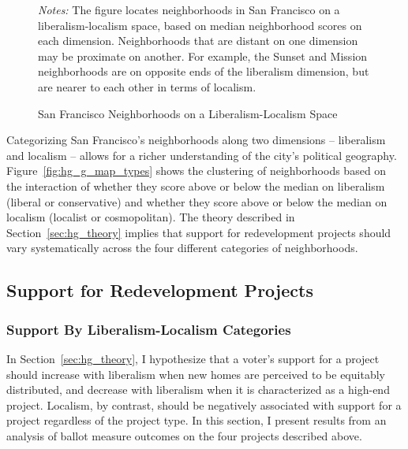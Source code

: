 \documentclass[article,12pt]{memoir}
\begin{document}
\begin{figure}\centering
  \caption{San Francisco Neighborhoods on a Liberalism-Localism Space}
  \label{fig:hg_g_libloc_space}
  \begin{measuredfigure}
  \end{measuredfigure}
  \begin{tablenotes}[flushleft]
    \item \hspace{-.2em}\emph{Notes:} The figure locates neighborhoods in San Francisco on a liberalism-localism space, based on median neighborhood scores on each dimension. Neighborhoods that are distant on one dimension may be proximate on another. For example, the Sunset and Mission neighborhoods are on opposite ends of the liberalism dimension, but are nearer to each other in terms of localism.
  \end{tablenotes}
\end{figure}

Categorizing San Francisco's neighborhoods along two dimensions -- liberalism and localism -- allows for a richer understanding of the city's political geography.  Figure~\ref{fig:hg_g_map_types} shows the clustering of neighborhoods based on the interaction of whether they score above or below the median on liberalism (liberal or conservative) and whether they score above or below the median on localism (localist or cosmopolitan).  The theory described in Section~\ref{sec:hg_theory} implies that support for redevelopment projects should vary systematically across the four different categories of neighborhoods.

\subsection{Support for Redevelopment Projects}

\subsubsection{Support By Liberalism-Localism Categories}

In Section~\ref{sec:hg_theory}, I hypothesize that a voter's support for a project should increase with liberalism when new homes are perceived to be equitably distributed, and decrease with liberalism when it is characterized as a high-end project.  Localism, by contrast, should be negatively associated with support for a project regardless of the project type.  In this section, I present results from an analysis of ballot measure outcomes on the four projects described above.
\end{document}
